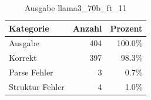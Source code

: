 
\begin{table}[!ht]
\centering
\begin{tabular}{lrr}
\toprule
\textbf{Kategorie} & \textbf{Anzahl} & \textbf{Prozent} \\
\midrule
Ausgabe & 404 & 100.0\% \\
Korrekt & 397 & 98.3\% \\
Parse Fehler & 3 & 0.7\% \\
Struktur Fehler & 4 & 1.0\% \\
\bottomrule
\end{tabular}
\caption{Ausgabe llama3_70b_ft_11}
\label{tab:file_counts}
\end{table}
    